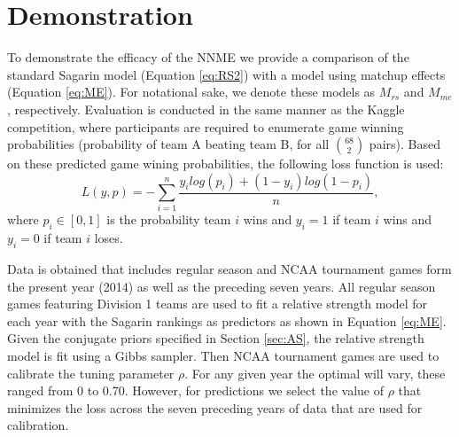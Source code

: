\documentclass[letterpaper,12pt]{article}
\begin{document}
\section{Demonstration}
To demonstrate the efficacy of the NNME we provide a comparison of the standard Sagarin model (Equation \ref{eq:RS2}) with a model using matchup effects (Equation \ref{eq:ME}). For notational sake, we denote these models as $M_{rs}$ and $M_{me}$, respectively. Evaluation is conducted in the same manner as the Kaggle competition, where participants are required to enumerate game winning probabilities (probability of team A beating team B, for all $68 \choose 2$ pairs). Based on these predicted game wining probabilities, the following loss function is used:
\begin{equation}\label{eq:kaggle_score}
L(y,p)=-\sum_{i=1}^n\frac{y_ilog(p_i)+ (1-y_i)log(1-p_i)}{n},
\end{equation}
where $p_i\in[0,1]$ is the probability team $i$ wins and $y_i=1$ if team $i$ wins and $y_i = 0$ if team $i$ loses.

Data is obtained that includes regular season and NCAA tournament games form the present year (2014) as well as the preceding seven years. All regular season games featuring Division 1 teams are used to fit a relative strength model for each year with the Sagarin rankings as predictors as shown in Equation \ref{eq:ME}. Given the conjugate priors specified in Section \ref{sec:AS}, the relative strength model is fit using a Gibbs sampler. Then NCAA tournament games are used to calibrate the tuning parameter $\rho$. For any given year the optimal will vary, these ranged from 0 to 0.70. However, for predictions we select the value of $\rho$ that minimizes the loss across the seven preceding years of data that are used for calibration.
\end{document}
